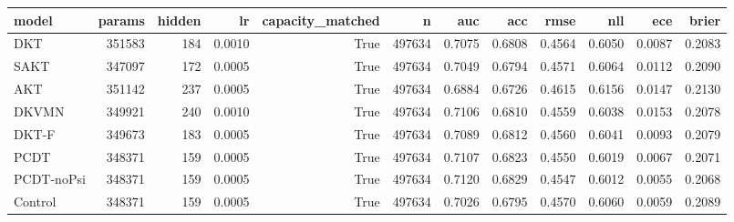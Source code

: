 \begin{tabular}{lrrrrrrrrrrr}
\toprule
model & params & hidden & lr & capacity\_matched & n & auc & acc & rmse & nll & ece & brier \\
\midrule
DKT & 351583 & 184 & 0.0010 & True & 497634 & 0.7075 & 0.6808 & 0.4564 & 0.6050 & 0.0087 & 0.2083 \\
SAKT & 347097 & 172 & 0.0005 & True & 497634 & 0.7049 & 0.6794 & 0.4571 & 0.6064 & 0.0112 & 0.2090 \\
AKT & 351142 & 237 & 0.0005 & True & 497634 & 0.6884 & 0.6726 & 0.4615 & 0.6156 & 0.0147 & 0.2130 \\
DKVMN & 349921 & 240 & 0.0010 & True & 497634 & 0.7106 & 0.6810 & 0.4559 & 0.6038 & 0.0153 & 0.2078 \\
DKT-F & 349673 & 183 & 0.0005 & True & 497634 & 0.7089 & 0.6812 & 0.4560 & 0.6041 & 0.0093 & 0.2079 \\
PCDT & 348371 & 159 & 0.0005 & True & 497634 & 0.7107 & 0.6823 & 0.4550 & 0.6019 & 0.0067 & 0.2071 \\
PCDT-noPsi & 348371 & 159 & 0.0005 & True & 497634 & 0.7120 & 0.6829 & 0.4547 & 0.6012 & 0.0055 & 0.2068 \\
Control & 348371 & 159 & 0.0005 & True & 497634 & 0.7026 & 0.6795 & 0.4570 & 0.6060 & 0.0059 & 0.2089 \\
\bottomrule
\end{tabular}
